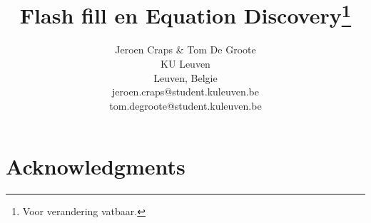 \documentclass{article}
\title{Flash fill en Equation Discovery\thanks{Voor verandering vatbaar.}}
\author{Jeroen Craps \& Tom De Groote \\
KU Leuven\\
Leuven, Belgie \\
jeroen.craps@student.kuleuven.be\\ 
tom.degroote@student.kuleuven.be}
\begin{document}
\maketitle







\section*{Acknowledgments}


\appendix




\end{document}
